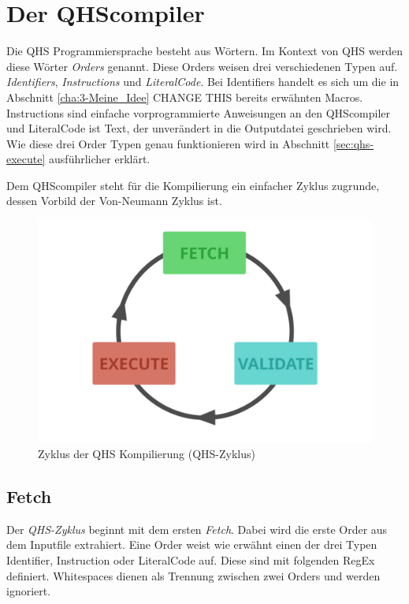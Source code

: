 \chapter{Der QHScompiler} \label{cha:4-QHS_Compiler}
Die QHS Programmiersprache besteht aus Wörtern. Im Kontext von QHS werden diese Wörter \textit{Orders} genannt. Diese Orders weisen drei verschiedenen Typen auf. \textit{Identifiers}, \textit{Instructions} und \textit{LiteralCode}.
Bei Identifiers handelt es sich um die in Abschnitt \ref{cha:3-Meine_Idee} CHANGE THIS bereits erwähnten Macros. Instructions sind einfache vorprogrammierte Anweisungen an den QHScompiler und LiteralCode ist Text, der unverändert
in die Outputdatei geschrieben wird. Wie diese drei Order Typen genau funktionieren wird in Abschnitt \ref{sec:qhs-execute} ausführlicher erklärt.

Dem QHScompiler steht für die Kompilierung ein einfacher Zyklus zugrunde, dessen Vorbild der Von-Neumann Zyklus ist.

\begin{figure}[h!]
    \centering
    \includegraphics[scale=0.6]{resources/images/qhs-cycle.png}
    \caption{Zyklus der QHS Kompilierung (QHS-Zyklus)}
    \label{fig:qhs-cycle}
\end{figure}

\section{Fetch} \label{sec:qhs-fetch}
Der \textit{QHS-Zyklus} beginnt mit dem ersten \textit{Fetch}. Dabei wird die erste Order aus dem Inputfile extrahiert. Eine Order weist wie erwähnt einen der drei Typen Identifier, Instruction oder LiteralCode auf.
Diese sind mit folgenden RegEx definiert. Whitespaces dienen als Trennung zwischen zwei Orders und werden ignoriert.

